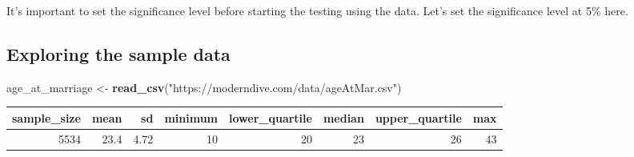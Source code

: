 \documentclass[12pt,]{krantz}
\makeatletter
\newenvironment{Shaded}{\begin{snugshade}}{\end{snugshade}}
\newcommand{\KeywordTok}[1]{\textcolor[rgb]{0.27,0.27,0.27}{\textbf{#1}}}
\newcommand{\DataTypeTok}[1]{\textcolor[rgb]{0.27,0.27,0.27}{#1}}
\newcommand{\DecValTok}[1]{\textcolor[rgb]{0.06,0.06,0.06}{#1}}
\newcommand{\FloatTok}[1]{\textcolor[rgb]{0.06,0.06,0.06}{#1}}
\newcommand{\StringTok}[1]{\textcolor[rgb]{0.5,0.5,0.5}{#1}}
\newcommand{\OperatorTok}[1]{\textcolor[rgb]{0.43,0.43,0.43}{\textbf{#1}}}
\newcommand{\NormalTok}[1]{#1}
\newenvironment{kframe}{%
\medskip{}
\setlength{\fboxsep}{.8em}
 \def\at@end@of@kframe{}%
 \ifinner\ifhmode%
  \def\at@end@of@kframe{\end{minipage}}%
  \begin{minipage}{\columnwidth}%
 \fi\fi%
 \def\FrameCommand##1{\hskip\@totalleftmargin \hskip-\fboxsep
 \colorbox{shadecolor}{##1}\hskip-\fboxsep
     \hskip-\linewidth \hskip-\@totalleftmargin \hskip\columnwidth}%
 \MakeFramed {\advance\hsize-\width
   \@totalleftmargin\z@ \linewidth\hsize
   \@setminipage}}%
 {\par\unskip\endMakeFramed%
 \at@end@of@kframe}
\renewenvironment{Shaded}{\begin{kframe}}{\end{kframe}}
\theoremstyle{definition}
\theoremstyle{definition}
\theoremstyle{definition}
\theoremstyle{remark}
\makeatother
\begin{document}
It's important to set the significance level before starting the testing
using the data. Let's set the significance level at 5\% here.

\subsection{Exploring the sample data}\label{exploring-the-sample-data}

\begin{Shaded}
\begin{Highlighting}[]
\NormalTok{age_at_marriage <-}\StringTok{ }\KeywordTok{read_csv}\NormalTok{(}\StringTok{"https://moderndive.com/data/ageAtMar.csv"}\NormalTok{)}
\end{Highlighting}
\end{Shaded}

\begin{Shaded}
\end{Shaded}

\begin{table}[H]
\centering\begingroup\fontsize{10}{12}\selectfont

\begin{tabular}{r|r|r|r|r|r|r|r}
\hline
sample\_size & mean & sd & minimum & lower\_quartile & median & upper\_quartile & max\\
\hline
5534 & 23.4 & 4.72 & 10 & 20 & 23 & 26 & 43\\
\hline
\end{tabular}
\endgroup{}
\end{table}
\end{document}
